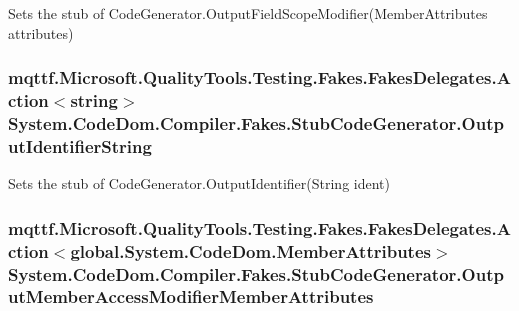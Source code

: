 Sets the stub of Code\-Generator.\-Output\-Field\-Scope\-Modifier(\-Member\-Attributes attributes)

\hypertarget{class_system_1_1_code_dom_1_1_compiler_1_1_fakes_1_1_stub_code_generator_a606c67f51b40104484e70949ddd23e24}{
\subsubsection[{Output\-Identifier\-String}]{\setlength{\rightskip}{0pt plus 5cm}mqttf.\-Microsoft.\-Quality\-Tools.\-Testing.\-Fakes.\-Fakes\-Delegates.\-Action$<$string$>$ System.\-Code\-Dom.\-Compiler.\-Fakes.\-Stub\-Code\-Generator.\-Output\-Identifier\-String}}\label{class_system_1_1_code_dom_1_1_compiler_1_1_fakes_1_1_stub_code_generator_a606c67f51b40104484e70949ddd23e24}


Sets the stub of Code\-Generator.\-Output\-Identifier(\-String ident)

\hypertarget{class_system_1_1_code_dom_1_1_compiler_1_1_fakes_1_1_stub_code_generator_a6918a6fab15e34f64088b80f518770aa}{
\subsubsection[{Output\-Member\-Access\-Modifier\-Member\-Attributes}]{\setlength{\rightskip}{0pt plus 5cm}mqttf.\-Microsoft.\-Quality\-Tools.\-Testing.\-Fakes.\-Fakes\-Delegates.\-Action$<$global.\-System.\-Code\-Dom.\-Member\-Attributes$>$ System.\-Code\-Dom.\-Compiler.\-Fakes.\-Stub\-Code\-Generator.\-Output\-Member\-Access\-Modifier\-Member\-Attributes}}\label{class_system_1_1_code_dom_1_1_compiler_1_1_fakes_1_1_stub_code_generator_a6918a6fab15e34f64088b80f518770aa}


